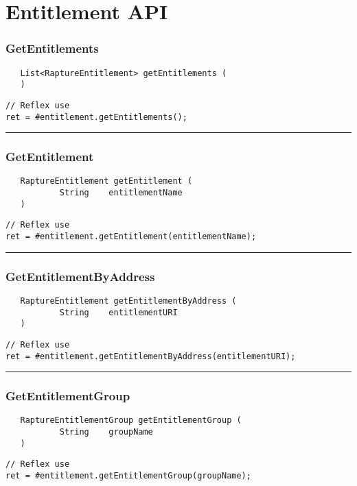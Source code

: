 \section{Entitlement API}

\subsubsection{GetEntitlements}
\label{Api:GetEntitlements}
\begin{verbatim}
   List<RaptureEntitlement> getEntitlements (
   )
\end{verbatim}
\begin{lstlisting}[language=reflex]
// Reflex use
ret = #entitlement.getEntitlements();
\end{lstlisting}



\rule{15cm}{2pt}
\subsubsection{GetEntitlement}
\label{Api:GetEntitlement}
\begin{verbatim}
   RaptureEntitlement getEntitlement (
           String    entitlementName
   )
\end{verbatim}
\begin{lstlisting}[language=reflex]
// Reflex use
ret = #entitlement.getEntitlement(entitlementName);
\end{lstlisting}



\rule{15cm}{2pt}
\subsubsection{GetEntitlementByAddress}
\label{Api:GetEntitlementByAddress}
\begin{verbatim}
   RaptureEntitlement getEntitlementByAddress (
           String    entitlementURI
   )
\end{verbatim}
\begin{lstlisting}[language=reflex]
// Reflex use
ret = #entitlement.getEntitlementByAddress(entitlementURI);
\end{lstlisting}



\rule{15cm}{2pt}
\subsubsection{GetEntitlementGroup}
\label{Api:GetEntitlementGroup}
\begin{verbatim}
   RaptureEntitlementGroup getEntitlementGroup (
           String    groupName
   )
\end{verbatim}
\begin{lstlisting}[language=reflex]
// Reflex use
ret = #entitlement.getEntitlementGroup(groupName);
\end{lstlisting}



